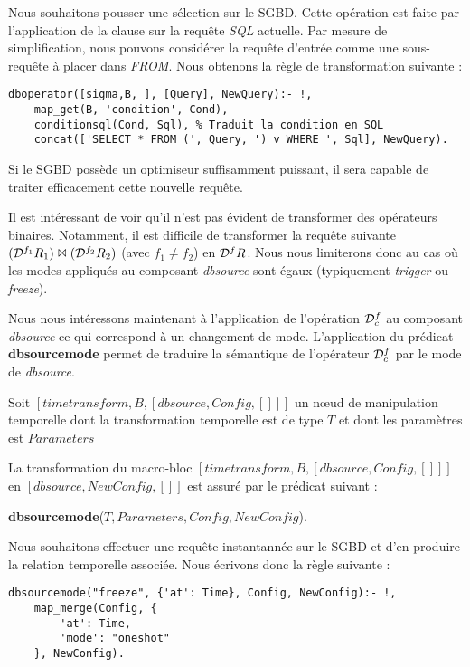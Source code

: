 \begin{example}
    Nous souhaitons pousser une sélection sur le SGBD. Cette opération est faite par l'application de la clause  sur la requête \textit{SQL} actuelle. Par mesure de simplification, nous pouvons considérer la requête d'entrée comme une sous-requête à placer dans \textit{FROM}. Nous obtenons la règle de transformation suivante :
    \begin{lstlisting}
dboperator([sigma,B,_], [Query], NewQuery):- !,
    map_get(B, 'condition', Cond),
    conditionsql(Cond, Sql), % Traduit la condition en SQL
    concat(['SELECT * FROM (', Query, ') v WHERE ', Sql], NewQuery).
    \end{lstlisting}

    Si le SGBD possède un optimiseur suffisamment puissant, il sera capable de traiter efficacement cette nouvelle requête.
\end{example}

Il est intéressant de voir qu'il n'est pas évident de transformer des opérateurs binaires. Notamment, il est difficile de transformer la requête suivante $(\mathcal{D}^{f_1} R_1)\Join (\mathcal{D}^{f_2} R_2)$ (avec $f_1\neq f_2$) en $\mathcal{D}^{f} R$. Nous nous limiterons donc au cas où les modes appliqués au composant \textit{dbsource} sont égaux (typiquement \textit{trigger} ou \textit{freeze}).

Nous nous intéressons maintenant à l'application de l'opération $\mathcal{D}^f_c$ au composant \textit{dbsource} ce qui correspond à un changement de mode. L'application du prédicat \textbf{dbsourcemode} permet de traduire la sémantique de l'opérateur $\mathcal{D}^f_c$ par le mode de \textit{dbsource}.
\begin{regle}
    Soit $[timetransform,B,[dbsource, Config, []]]$ un nœud de manipulation temporelle dont la transformation temporelle est de type $T$ et dont les paramètres est $Parameters$

    La transformation du macro-bloc $[timetransform,B,[dbsource, Config, []]]$ en $[dbsource,NewConfig,[]]$ est assuré par le prédicat suivant :
    \begin{center} \textbf{dbsourcemode}($T, Parameters, Config, NewConfig$).\end{center}
\end{regle}
\begin{example}
    Nous souhaitons effectuer une requête instantannée sur le SGBD et d'en produire la relation temporelle associée. Nous écrivons donc la règle suivante :
    \begin{lstlisting}
dbsourcemode("freeze", {'at': Time}, Config, NewConfig):- !,
    map_merge(Config, {
        'at': Time,
        'mode': "oneshot"
    }, NewConfig).
    \end{lstlisting}
\end{example}

